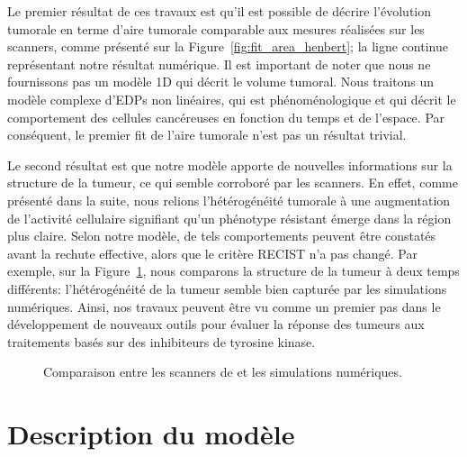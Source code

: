\documentclass[main.tex]{subfiles}
\begin{document}
Le premier résultat de ces travaux est qu'il est possible de décrire l'évolution tumorale en terme d'aire tumorale comparable aux mesures réalisées sur les scanners, comme présenté sur la  Figure~\ref{fig:fit_area_henbert}; la ligne continue représentant notre résultat numérique. Il est important de noter que nous ne fournissons pas un modèle 1D qui décrit le volume tumoral. Nous traitons un modèle complexe d'EDPs non linéaires, qui est phénoménologique et qui décrit le comportement des cellules cancéreuses en fonction du temps et de l'espace. Par conséquent, le premier fit de l'aire tumorale n'est pas un résultat trivial.


Le second résultat est que notre modèle apporte de nouvelles informations sur la structure de la tumeur, ce qui semble corroboré par les scanners. En effet, comme présenté dans la suite, nous relions l'hétérogénéité tumorale à une augmentation de l'activité cellulaire signifiant qu'un phénotype résistant émerge dans la région plus claire. Selon notre modèle, de tels comportements peuvent être constatés avant la rechute effective, alors que le critère RECIST n'a pas changé. Par exemple, sur la Figure~\ref{fig:compare_spatial_nber}, 
nous comparons la structure de la tumeur à deux temps différents: l'hétérogénéité de la tumeur semble bien capturée par les simulations numériques. Ainsi, nos travaux peuvent être vu comme un premier pas dans le développement de nouveaux outils pour évaluer la réponse des tumeurs aux traitements  basés sur des inhibiteurs de tyrosine kinase.

\begin{figure}[htpb]
\vspace{-1cm}
\caption{\label{fig:compare_spatial_nber}
Comparaison entre les scanners de \Nber et les simulations numériques.
}
\end{figure}
\section{Description du modèle}
\end{document}
